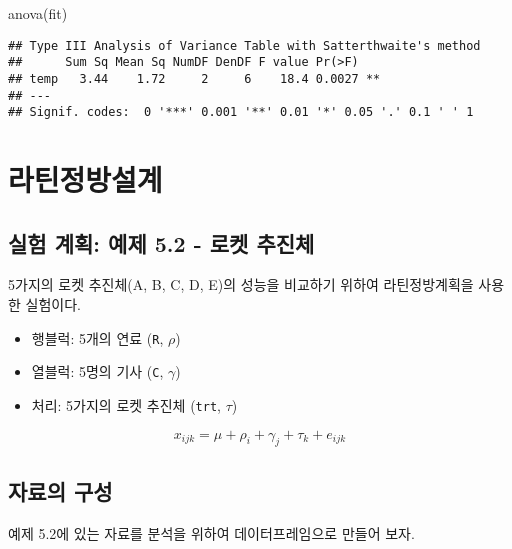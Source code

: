 \documentclass[
]{book}
\newenvironment{Shaded}{\begin{snugshade}}{\end{snugshade}}
\newcommand{\FunctionTok}[1]{\textcolor[rgb]{0.00,0.00,0.00}{#1}}
\newcommand{\NormalTok}[1]{#1}
\providecommand{\tightlist}{%
  \setlength{\itemsep}{0pt}\setlength{\parskip}{0pt}}
\begin{document}
\begin{Shaded}
\begin{Highlighting}[]
\FunctionTok{anova}\NormalTok{(fit)}
\end{Highlighting}
\end{Shaded}

\begin{verbatim}
## Type III Analysis of Variance Table with Satterthwaite's method
##      Sum Sq Mean Sq NumDF DenDF F value Pr(>F)   
## temp   3.44    1.72     2     6    18.4 0.0027 **
## ---
## Signif. codes:  0 '***' 0.001 '**' 0.01 '*' 0.05 '.' 0.1 ' ' 1
\end{verbatim}

\hypertarget{ex52}{%
\chapter{라틴정방설계}\label{ex52}}

\hypertarget{uxc2e4uxd5d8-uxacc4uxd68d-uxc608uxc81c-5.2---uxb85cuxcf13-uxcd94uxc9c4uxccb4}{%
\section{실험 계획: 예제 5.2 - 로켓 추진체}\label{uxc2e4uxd5d8-uxacc4uxd68d-uxc608uxc81c-5.2---uxb85cuxcf13-uxcd94uxc9c4uxccb4}}

5가지의 로켓 추진체(A, B, C, D, E)의 성능을 비교하기 위하여 라틴정방계획을 사용한 실험이다.

\begin{itemize}
\tightlist
\item
  행블럭: 5개의 연료 (\texttt{R}, \(\rho\))
\item
  열블럭: 5명의 기사 (\texttt{C}, \(\gamma\))
\item
  처리: 5가지의 로켓 추진체 (\texttt{trt}, \(\tau\))
\end{itemize}

\[ x_{ijk} = \mu+ \rho_i + \gamma_j + \tau_k + e_{ijk }\]

\hypertarget{uxc790uxb8ccuxc758-uxad6cuxc131-1}{%
\section{자료의 구성}\label{uxc790uxb8ccuxc758-uxad6cuxc131-1}}

예제 5.2에 있는 자료를 분석을 위하여 데이터프레임으로 만들어 보자.
\end{document}
